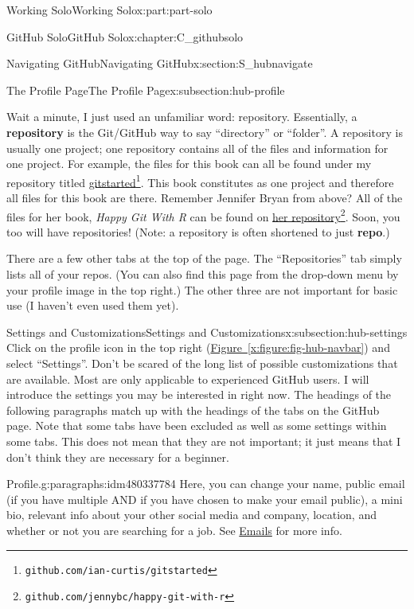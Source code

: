 \documentclass[oneside,10pt,]{book}
\newcommand{\xreffont}{\relax}
\newcommand{\terminology}[1]{\textbf{#1}}
\newcommand{\pubtitle}[1]{\textsl{#1}}
\begin{document}
\begin{partptx}{Working Solo}{}{Working Solo}{}{}{x:part:part-solo}
\begin{chapterptx}{GitHub Solo}{}{GitHub Solo}{}{}{x:chapter:C_githubsolo}
\begin{sectionptx}{Navigating GitHub}{}{Navigating GitHub}{}{}{x:section:S_hubnavigate}
\begin{subsectionptx}{The Profile Page}{}{The Profile Page}{}{}{x:subsection:hub-profile}
\par
Wait a minute, I just used an unfamiliar word: repository. Essentially, a \terminology{repository} is the Git\slash{}GitHub way to say ``directory'' or ``folder''. A repository is usually one project; one repository contains all of the files and information for one project. For example, the files for this book can all be found under my repository titled \href{https://github.com/ian-curtis/gitstarted}{gitstarted}\footnote{\nolinkurl{github.com/ian-curtis/gitstarted}\label{g:fn:idm480348536}}. This book constitutes as one project and therefore all files for this book are there. Remember Jennifer Bryan from above? All of the files for her book, \pubtitle{Happy Git With R} can be found on \href{https://github.com/jennybc/happy-git-with-r}{her repository}\footnote{\nolinkurl{github.com/jennybc/happy-git-with-r}\label{g:fn:idm480346616}}. Soon, you too will have repositories! (Note: a repository is often shortened to just \terminology{repo}.)%
\par
There are a few other tabs at the top of the page. The ``Repositories'' tab simply lists all of your repos. (You can also find this page from the drop-down menu by your profile image in the top right.) The other three are not important for basic use (I haven't even used them yet).%
\end{subsectionptx}
%
%
\typeout{************************************************}
\typeout{************************************************}
%
\begin{subsectionptx}{Settings and Customizations}{}{Settings and Customizations}{}{}{x:subsection:hub-settings}
%
%
Click on the profile icon in the top right (\hyperref[x:figure:fig-hub-navbar]{Figure~{\xreffont\ref{x:figure:fig-hub-navbar}}}) and select ``Settings''. Don't be scared of the long list of possible customizations that are available. Most are only applicable to experienced GitHub users. I will introduce the settings you may be interested in right now. The headings of the following paragraphs match up with the headings of the tabs on the GitHub page. Note that some tabs have been excluded as well as some settings within some tabs. This does not mean that they are not important; it just means that I don't think they are necessary for a beginner.%
\begin{paragraphs}{Profile.}{g:paragraphs:idm480337784}%
%
Here, you can change your name, public email (if you have multiple AND if you have chosen to make your email public), a mini bio, relevant info about your other social media and company, location, and whether or not you are searching for a job. See \hyperlink{x:paragraphs:hub-emails}{Emails} for more info.%

\end{paragraphs}
\end{subsectionptx}
\end{sectionptx}
\end{chapterptx}
\end{partptx}
\end{document}
